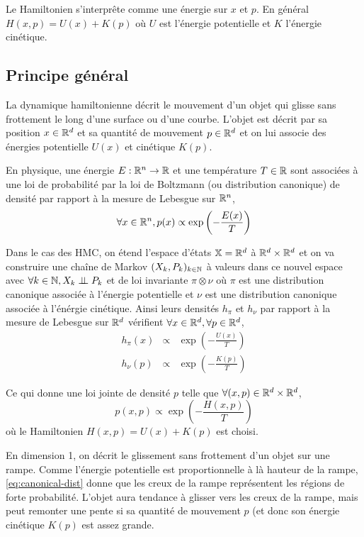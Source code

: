 \documentclass[10pt,a4paper]{article}
\begin{document}
Le Hamiltonien s'interprête comme une énergie sur $x$ et $p$. En général $H(x,p) = U(x) + K(p)$ où $U$ est l'énergie potentielle et $K$ l'énergie cinétique.

\subsection{Principe général}
La dynamique hamiltonienne décrit le mouvement d'un objet qui glisse sans frottement le long d'une surface ou d'une courbe. L'objet est décrit par sa position $x \in \mathbb{R}^d$ et sa quantité de mouvement $p \in \mathbb{R}^d$ et on lui associe des énergies potentielle $U(x)$ et cinétique $K(p)$.

\begin{Def}
En physique, une énergie $E : \mathbb{R}^n \to \mathbb{R}$ et une température $T \in \mathbb{R}$ sont associées à une loi de probabilité par la loi de Boltzmann (ou distribution canonique) de densité par rapport à la mesure de Lebesgue sur $\mathbb{R}^n$,
$$\forall x \in \mathbb{R}^n,  p(x) \propto \exp \left( -\frac{E(x)}{T} \right)$$
\end{Def}


Dans le cas des HMC, on étend l'espace d'états $\mathbb{X} = \mathbb{R}^d$ à $\mathbb{R}^d \times \mathbb{R}^d$ et on va construire une chaîne de Markov $(X_k, P_k)_{k \in \mathbb{N}}$ à valeurs dans ce nouvel espace avec $\forall k \in \mathbb{N}, X_k \perp\!\!\!\perp P_k$ et de loi invariante $\pi \otimes \nu$ où $\pi$ est une distribution canonique associée à l'énergie potentielle et $\nu$ est une distribution canonique associée à l'énérgie cinétique. Ainsi leurs densités $h_\pi$ et $h_\nu$ par rapport à la mesure de Lebesgue sur $\mathbb{R}^d$ vérifient $\forall x \in \mathbb{R}^d, \forall p \in \mathbb{R}^d$,
\begin{eqnarray*}
  h_\pi(x) & \propto &  \exp \left( -\frac{U(x)}{T} \right) \\
  h_\nu(p) & \propto &  \exp \left( -\frac{K(p)}{T} \right)
\end{eqnarray*}

Ce qui donne une loi jointe de densité $p$ telle que $\forall (x,p) \in \mathbb{R}^d \times \mathbb{R}^d$, 
\begin{equation}\label{eq:canonical-dist}
p(x,p) \propto \exp \left( -\frac{H(x,p)}{T} \right)
\end{equation}
où le Hamiltonien $H(x,p) = U(x) + K(p)$ est choisi.

\begin{Rque}
En dimension 1, on décrit le glissement sans frottement d'un objet sur une rampe. Comme l'énergie potentielle est proportionnelle à là hauteur de la rampe, \eqref{eq:canonical-dist} donne que les creux de la rampe représentent les régions de forte probabilité. L'objet aura tendance à glisser vers les creux de la rampe, mais peut remonter une pente si sa quantité de mouvement $p$ (et donc son énergie cinétique $K(p)$ est assez grande.
\end{Rque}
\end{document}
